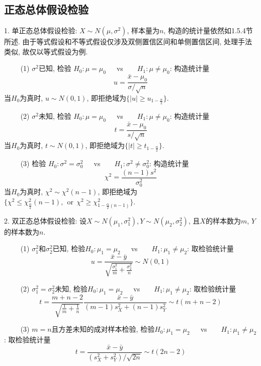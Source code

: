 \subsection{正态总体假设检验}

1. 单正态总体假设检验: $X \sim N(\mu,\sigma^2)$, 样本量为$n$, 构造的统计量依然如1.5.4节所述. 由于等式假设和不等式假设仅涉及双侧置信区间和单侧置信区间, 处理手法类似, 故仅以等式假设为例.

~~~~ (1) $\sigma^2$已知, 检验 $H_0:\mu =\mu_0$~~~vs~~~~$H_1:\mu \neq \mu_0$: 构造统计量
\begin{equation*}
    u=\frac{\bar{x}-\mu_0}{\sigma/\sqrt{n}}
\end{equation*}
当$H_0$为真时, $u\sim N(0,1)$, 即拒绝域为$\{|u|\geq u_{1-\frac{\alpha}{2}}\}$.

~~~~ (2) $\sigma^2$未知, 检验 $H_0:\mu =\mu_0$~~~vs~~~~$H_1:\mu \neq \mu_0$: 构造统计量
\begin{equation*}
    t=\frac{\bar{x}-\mu_0}{s/\sqrt{n}}
\end{equation*}
当$H_0$为真时, $t\sim N(0,1)$, 即拒绝域为$\{|t|\geq t_{1-\frac{\alpha}{2}}\}$.

~~~~ (3) 检验 $H_0:\sigma^2 =\sigma_0^2$~~~vs~~~~$H_1:\sigma^2 \neq \sigma_0^2$: 构造统计量
\begin{equation*}
    \chi^2=\frac{(n-1)s^2}{\sigma_0^2}
\end{equation*}
当$H_0$为真时, $\chi^2 \sim \chi^2(n-1)$, 即拒绝域为$\{\chi^2 \leq \chi^2_{\frac{\alpha}{2}}(n-1),~~\text{or}~~\chi^2\geq \chi^2_{1-\frac{\alpha}{2}(n-1)}\}$.

2. 双正态总体假设检验: 设$X\sim N(\mu_1,\sigma_1^2), Y\sim N(\mu_2,\sigma_2^2)$, 且$X$的样本数为$m$, $Y$的样本数为$n$.

~~~~ (1) $\sigma_1^2$和$\sigma_2^2$已知, 检验$H_0:\mu_1 =\mu_2$~~~vs~~~~$H_1:\mu_1 \neq \mu_2$: 取检验统计量
\begin{equation*}
    u=\frac{\bar{x}-\bar{y}}{\sqrt{\frac{\sigma_1^2}{m}+\frac{\sigma_2^2}{n}}} \sim N(0,1)
\end{equation*}

~~~~ (2) $\sigma_1^2=\sigma_2^2$未知, 检验$H_0:\mu_1 =\mu_2$~~~vs~~~~$H_1:\mu_1 \neq \mu_2$: 取检验统计量
\begin{equation*}
    t=\frac{m+n-2}{\sqrt{\frac{1}{m}+\frac{1}{n}}}\frac{\bar{x}-\bar{y}}{(m-1)s_X^2+(n-1)s_Y^2} \sim t(m+n-2)
\end{equation*}

~~~~ (3) $m=n$且方差未知的成对样本检验, 检验$H_0:\mu_1 =\mu_2$~~~vs~~~~$H_1:\mu_1 \neq \mu_2$: 取检验统计量
\begin{equation*}
    t=\frac{\bar{x}-\bar{y}}{(s_X^2+s_Y^2)/\sqrt{2n}} \sim t(2n-2)
\end{equation*}


